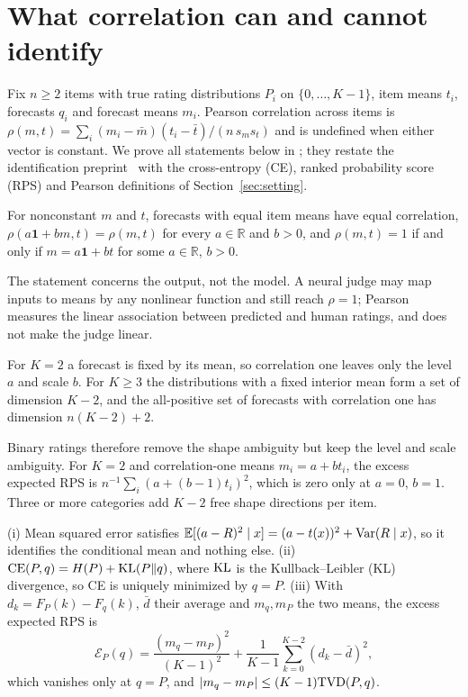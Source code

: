 \section{What correlation can and cannot identify}
\label{sec:identification}

Fix $n\ge2$ items with true rating distributions $P_i$ on $\{0,\dots,K-1\}$, item means $t_i$, forecasts $q_i$ and forecast means $m_i$.
Pearson correlation across items is $\rho(m,t)=\sum_i(m_i-\bar m)(t_i-\bar t)/(n\,s_m s_t)$ and is undefined when either vector is constant.
We prove all statements below in ; they restate the identification preprint~\citep{miranda2026correlation} with the cross-entropy (CE), ranked probability score (RPS) and Pearson definitions of Section~\ref{sec:setting}.

\begin{proposition}
\label{prop:affine}
For nonconstant $m$ and $t$, forecasts with equal item means have equal correlation, $\rho(a\mathbf 1+bm,t)=\rho(m,t)$ for every $a\in\mathbb R$ and $b>0$, and $\rho(m,t)=1$ if and only if $m=a\mathbf 1+bt$ for some $a\in\mathbb R$, $b>0$.
\end{proposition}

The statement concerns the output, not the model.
A neural judge may map inputs to means by any nonlinear function and still reach $\rho=1$; Pearson measures the linear association between predicted and human ratings, and does not make the judge linear.

\begin{proposition}
\label{prop:dimension}
For $K=2$ a forecast is fixed by its mean, so correlation one leaves only the level $a$ and scale $b$.
For $K\ge3$ the distributions with a fixed interior mean form a set of dimension $K-2$, and the all-positive set of forecasts with correlation one has dimension $n(K-2)+2$.
\end{proposition}

Binary ratings therefore remove the shape ambiguity but keep the level and scale ambiguity.
For $K=2$ and correlation-one means $m_i=a+bt_i$, the excess expected RPS is $n^{-1}\sum_i(a+(b-1)t_i)^2$, which is zero only at $a=0$, $b=1$.
Three or more categories add $K-2$ free shape directions per item.

\begin{proposition}
\label{prop:losses}
(i) Mean squared error satisfies $\mathbb{E}[(a-R)^2\mid x]=(a-t(x))^2+\operatorname{Var}(R\mid x)$, so it identifies the conditional mean and nothing else.
(ii) $\mathrm{CE}(P,q)=H(P)+\mathrm{KL}(P\|q)$, where $\mathrm{KL}$ is the Kullback--Leibler (KL) divergence, so CE is uniquely minimized by $q=P$.
(iii) With $d_k=F_P(k)-F_q(k)$, $\bar d$ their average and $m_q,m_P$ the two means, the excess expected RPS is
\begin{equation}
\mathcal E_P(q)=\frac{(m_q-m_P)^2}{(K-1)^2}+\frac1{K-1}\sum_{k=0}^{K-2}(d_k-\bar d)^2 ,
\label{eq:rps-decomp}
\end{equation}
which vanishes only at $q=P$, and $|m_q-m_P|\le(K-1)\mathrm{TVD}(P,q)$.
\end{proposition}

